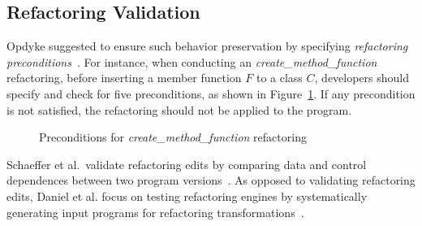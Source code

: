 \documentclass[runningheads,a4paper]{llncs}
\begin{document}
\subsection{Refactoring Validation} 

Opdyke suggested to ensure such behavior preservation by specifying \emph{refactoring preconditions}~\cite{Opdyke1992:ROF}. For instance, when conducting an \emph{create\_method\_function} refactoring, before inserting a member function $F$ to a class $C$, developers should specify and check for five preconditions, as shown in Figure~\ref{fig:preconditions}. If any precondition is not satisfied, the refactoring should not be applied to the program.

\begin{figure}[!htb]
\centering
{}
\caption{Preconditions for \emph{create\_method\_function} refactoring~\cite{Opdyke1992:ROF}}
\label{fig:preconditions}
\end{figure}

Schaeffer et al.~validate refactoring edits by comparing data and control dependences between two program versions~\cite{Schaefer2010:refactoring}. As opposed to validating refactoring edits, Daniel et al. focus on testing refactoring engines by systematically generating input programs for refactoring transformations~\cite{Brett2007:reftest}. 
\end{document}
